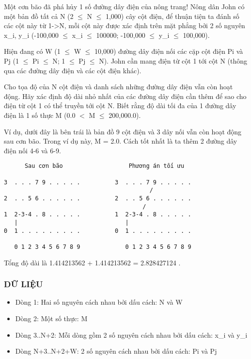 



   Một cơn bão đã phá hủy 1 số đường dây điện của nông trang! Nông dân  John có một bản đồ tất cả N (2  $\le$  N  $\le$  1,000) cây cột điện, để thuận tiện ta đánh số các cột này từ 1->N, mỗi cột này được xác định  trên mặt phẳng bởi 2 số nguyên x\_i,  y\_i (-100,000  $\le$  x\_i  $\le$  100000; -100,000  $\le$  y\_i  $\le$  100,000).  

   Hiện đang có W (1  $\le$  W  $\le$  10,000) đường dây điện nối các cặp cột điện  Pi và Pj (1  $\le$  Pi  $\le$  N; 1  $\le$  Pj  $\le$  N).  John cần mang điện từ cột 1 tới cột N (thông qua các đường dây điện và  các cột điện khác).  

   Cho tọa độ của N cột điện và danh sách những đường dây điện vẫn còn hoạt  động. Hãy xác định độ dài nhỏ nhất của các đường dây điện cần thêm để sao  cho điện từ cột 1 có thể truyền tới cột N. Biết rằng độ dài tối đa của  1 đường dây điện là 1 số thực M (0.0 $<$ M  $\le$  200,000.0).  

   Ví dụ, dưới đây là bên trái là bản đồ 9 cột điện và 3 dây nối vẫn còn hoạt động sau cơn bão. Trong ví dụ này, M = 2.0. Cách tốt nhất là ta thêm 2 đường dây điện nối 4-6 và 6-9.  
\begin{verbatim}
      Sau cơn bão                   Phương án tối ưu

3  . . . 7 9 . . . . .          3  . . . 7 9 . . . . .
                                          /
2  . . 5 6 . . . . . .          2  . . 5 6 . . . . . .
                                        /
1  2-3-4 . 8 . . . . .          1  2-3-4 . 8 . . . . .
   |                               |
0  1 . . . . . . . . .          0  1 . . . . . . . . .

   0 1 2 3 4 5 6 7 8 9             0 1 2 3 4 5 6 7 8 9
\end{verbatim}

   Tổng độ dài là 1.414213562 + 1.414213562 = 2.828427124 .  

\subsubsection{   DỮ LIỆU  }
\begin{itemize}
	\item     Dòng 1: Hai số nguyên cách nhau bởi dấu cách: N và W   
	\item     Dòng 2: Một số thực: M   
	\item     Dòng 3..N+2: Mỗi dòng gồm 2 số nguyên cách nhau bởi dấu cách: x\_i         và y\_i   
	\item     Dòng N+3..N+2+W: 2 số nguyên cách nhau bởi dấu cách: Pi và Pj   
\end{itemize}

